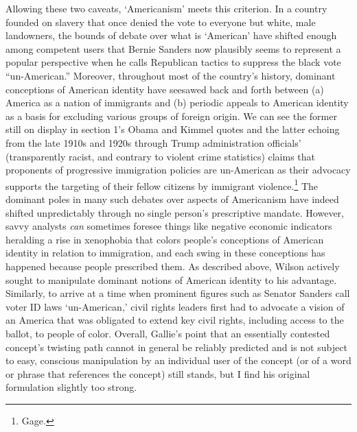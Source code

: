 Allowing these two caveats, `Americanism' meets this criterion. In a
country founded on slavery that once denied the vote to everyone but
white, male landowners, the bounds of debate over what is `American'
have shifted enough among competent users that Bernie Sanders now
plausibly seems to represent a popular perspective when he calls
Republican tactics to suppress the black vote ``un-American.'' Moreover,
throughout most of the country's history, dominant conceptions of
American identity have seesawed back and forth between (a) America as a
nation of immigrants and (b) periodic appeals to American identity as a
basis for excluding various groups of foreign origin. We can see the
former still on display in section 1's Obama and Kimmel quotes and the
latter echoing from the late 1910s and 1920s through Trump
administration officials' (transparently racist, and contrary to violent
crime statistics) claims that proponents of progressive immigration
policies are un-American as their advocacy supports the targeting of
their fellow citizens by immigrant violence.\footnote{Gage.} The
dominant poles in many such debates over aspects of Americanism have
indeed shifted unpredictably through no single person's prescriptive
mandate. However, savvy analysts \emph{can} sometimes foresee things
like negative economic indicators heralding a rise in xenophobia that
colors people's conceptions of American identity in relation to
immigration, and each swing in these conceptions has happened because
people prescribed them. As described above, Wilson actively sought to
manipulate dominant notions of American identity to his advantage.
Similarly, to arrive at a time when prominent figures such as Senator
Sanders call voter ID laws `un-American,' civil rights leaders first had
to advocate a vision of an America that was obligated to extend key
civil rights, including access to the ballot, to people of color.
Overall, Gallie's point that an essentially contested concept's twisting
path cannot in general be reliably predicted and is not subject to easy,
conscious manipulation by an individual user of the concept (or of a
word or phrase that references the concept) still stands, but I find his
original formulation slightly too strong.

